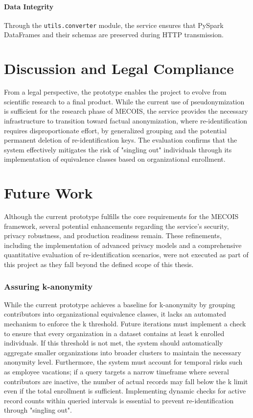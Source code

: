 \paragraph{Data Integrity} Through the \texttt{utils.converter} module, the service ensures that PySpark DataFrames and their schemas are preserved during \ac{HTTP} transmission.


\section{Discussion and Legal Compliance}

From a legal perspective, the prototype enables the project to evolve from scientific research to a final product. While the current use of pseudonymization is sufficient for the research phase of MECOIS, the service provides the necessary infrastructure to transition toward factual anonymization, where re-identification requires disproportionate effort, by generalized grouping and the potential permanent deletion of re-identification keys. The evaluation confirms that the system effectively mitigates the risk of "singling out" individuals through its implementation of equivalence classes based on organizational enrollment.

\section{Future Work}

Although the current prototype fulfills the core requirements for the MECOIS framework, several potential enhancements regarding the service's security, privacy robustness, and production readiness remain. These refinements, including the implementation of advanced privacy models and a comprehensive quantitative evaluation of re-identification scenarios, were not executed as part of this project as they fall beyond the defined scope of this thesis.

\subsubsection{Assuring k-anonymity}
While the current prototype achieves a baseline for k-anonymity by grouping contributors into organizational equivalence classes, it lacks an automated mechanism to enforce the k threshold. Future iterations must implement a check to ensure that every organization in a dataset contains at least k enrolled individuals. If this threshold is not met, the system should automatically aggregate smaller organizations into broader clusters to maintain the necessary anonymity level. Furthermore, the system must account for temporal risks such as employee vacations; if a query targets a narrow timeframe where several contributors are inactive, the number of actual records may fall below the k limit even if the total enrollment is sufficient. Implementing dynamic checks for active record counts within queried intervals is essential to prevent re-identification through "singling out".

